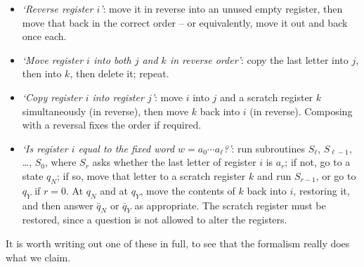 \documentclass[a4paper]{scrartcl}
\begin{document}
\begin{itemize}
	\item \emph{`Reverse register $i$'}: move it in reverse into an unused empty register, then move that back in the correct order -- or equivalently, move it out and back once each.
	\item \emph{`Move register $i$ into both $j$ and $k$ in reverse order'}: copy the last letter into $j$, then into $k$, then delete it; repeat.
	\item \emph{`Copy register $i$ into register $j$'}: move $i$ into $j$ and a scratch register $k$ simultaneously (in reverse), then move $k$ back into $i$ (in reverse). Composing with a reversal fixes the order if required.
	\item \emph{`Is register $i$ equal to the fixed word $w = a_0\cdots a_\ell$?'}: run subroutines $S_\ell$, $S_{\ell-1}$, \dots, $S_0$, where $S_r$ asks whether the last letter of register $i$ is $a_r$; if not, go to a state $q_N$; if so, move that letter to a scratch register $k$ and run $S_{r-1}$, or go to $q_Y$ if $r = 0$. At $q_N$ and at $q_Y$, move the contents of $k$ back into $i$, restoring it, and then answer $\bar q_N$ or $\bar q_Y$ as appropriate. The scratch register must be restored, since a question is not allowed to alter the registers.
\end{itemize}

It is worth writing out one of these in full, to see that the formalism really does what we claim.
\end{document}
